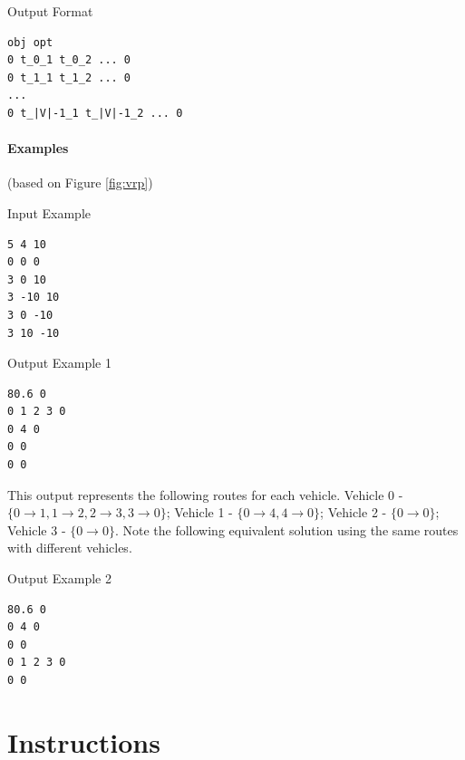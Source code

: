 \documentclass[11pt]{article}
\begin{document}
\vspace{0.2cm}
\noindent
Output Format
\vspace{-0.2cm}
\begin{Verbatim}[frame=single]
obj opt
0 t_0_1 t_0_2 ... 0 
0 t_1_1 t_1_2 ... 0 
...
0 t_|V|-1_1 t_|V|-1_2 ... 0
\end{Verbatim}
%

\clearpage
\paragraph{Examples} \mbox{}
\noindent
(based on Figure \ref{fig:vrp})

\vspace{0.2cm}
\noindent
Input Example
\vspace{-0.2cm}
\begin{Verbatim}[frame=single]
5 4 10
0 0 0
3 0 10
3 -10 10
3 0 -10
3 10 -10
\end{Verbatim}

\vspace{0.2cm}
\noindent
Output Example 1
\vspace{-0.2cm}
\begin{Verbatim}[frame=single]
80.6 0
0 1 2 3 0 
0 4 0
0 0
0 0
\end{Verbatim}
%
This output represents the following routes for each vehicle.  Vehicle 0 - $\{0 \rightarrow 1, 1 \rightarrow 2, 2 \rightarrow 3, 3 \rightarrow 0\}$;  Vehicle 1 - $\{0 \rightarrow 4, 4 \rightarrow 0\}$; Vehicle 2 - $\{0 \rightarrow 0\}$; Vehicle 3 - $\{0 \rightarrow 0\}$.  Note the following equivalent solution using the same routes with different vehicles.  

\vspace{0.2cm}
\noindent
Output Example 2
\vspace{-0.2cm}
\begin{Verbatim}[frame=single]
80.6 0
0 4 0
0 0
0 1 2 3 0 
0 0
\end{Verbatim}

\section{Instructions}



\end{document}
